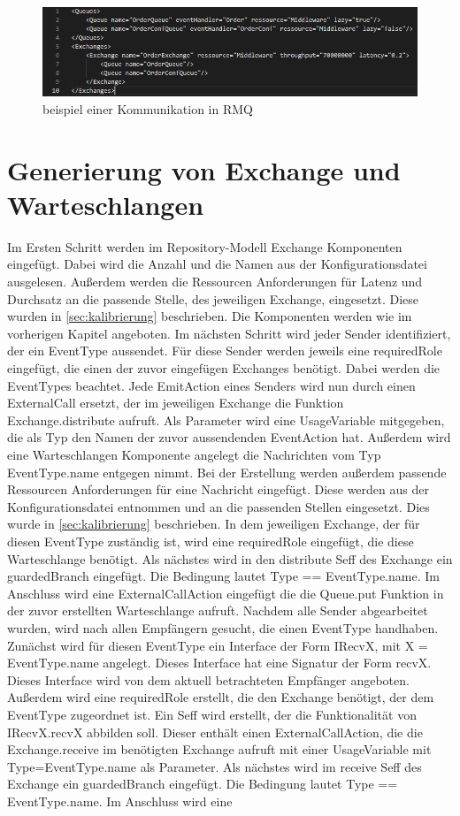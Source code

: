 \begin{figure}
\center
  \includegraphics[width=1\textwidth]{code/configExample.png}
  \caption{beispiel einer Kommunikation in RMQ}
  \label{img:configExample}
\end{figure}

\section{Generierung von Exchange und Warteschlangen}
Im Ersten Schritt werden im Repository-Modell Exchange Komponenten eingefügt. Dabei wird die Anzahl und die Namen aus der Konfigurationsdatei ausgelesen. Außerdem werden die Ressourcen Anforderungen für Latenz und Durchsatz an die passende Stelle, des jeweiligen Exchange, eingesetzt. Diese wurden in \autoref{sec:kalibrierung} beschrieben. Die Komponenten werden wie im vorherigen Kapitel angeboten. Im nächsten Schritt wird jeder Sender identifiziert, der ein EventType aussendet. Für diese Sender werden jeweils eine requiredRole eingefügt, die einen der zuvor eingefügen Exchanges benötigt. Dabei werden die EventTypes beachtet. Jede EmitAction eines Senders wird nun durch einen ExternalCall ersetzt, der im jeweiligen Exchange die Funktion Exchange.distribute aufruft. Als Parameter wird eine UsageVariable mitgegeben, die als Typ den Namen der zuvor aussendenden EventAction hat. Außerdem wird eine Warteschlangen Komponente angelegt die Nachrichten vom Typ EventType.name entgegen nimmt. Bei der Erstellung werden außerdem passende Ressourcen Anforderungen für eine Nachricht eingefügt. Diese werden aus der Konfigurationsdatei entnommen und an die passenden Stellen eingesetzt. Dies wurde in \autoref{sec:kalibrierung} beschrieben. In dem jeweiligen Exchange, der für diesen EventType zuständig ist, wird eine requiredRole eingefügt, die diese Warteschlange benötigt. Als nächstes wird in den distribute Seff des Exchange ein guardedBranch eingefügt. Die Bedingung lautet Type == EventType.name. Im Anschluss wird eine ExternalCallAction eingefügt die die Queue.put Funktion in der zuvor erstellten Warteschlange aufruft. Nachdem alle Sender abgearbeitet wurden, wird nach allen Empfängern gesucht, die einen EventType handhaben. Zunächst wird für diesen EventType ein Interface der Form IRecvX, mit X = EventType.name angelegt. Dieses Interface hat eine Signatur der Form recvX. Dieses Interface wird von dem aktuell betrachteten Empfänger angeboten. Außerdem wird eine requiredRole erstellt, die den Exchange benötigt, der dem EventType zugeordnet ist. Ein Seff wird erstellt, der die Funktionalität von IRecvX.recvX abbilden soll. Dieser enthält einen ExternalCallAction, die die Exchange.receive im benötigten Exchange aufruft mit einer UsageVariable mit Type=EventType.name als Parameter. Als nächstes wird im receive Seff des Exchange ein guardedBranch eingefügt. Die Bedingung lautet Type == EventType.name. Im Anschluss wird eine 